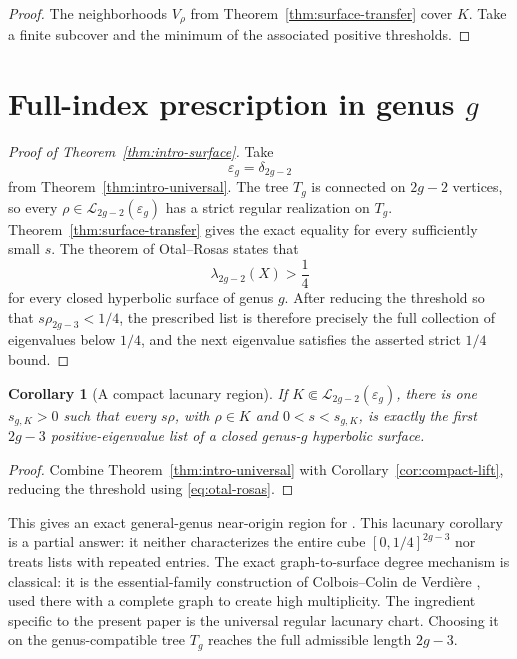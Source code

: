 \documentclass[11pt,reqno]{amsart}
\newtheorem{corollary}[theorem]{Corollary}
\theoremstyle{definition}
\theoremstyle{remark}
\newcommand{\cL}{\mathcal L}
\begin{document}
\begin{proof}
The neighborhoods $V_\rho$ from Theorem~\ref{thm:surface-transfer} cover
$K$.  Take a finite subcover and the minimum of the associated positive
thresholds.
\end{proof}

\section{Full-index prescription in genus \texorpdfstring{$g$}{g}}
\label{sec:full-index}

\begin{proof}[Proof of Theorem~\ref{thm:intro-surface}]
Take
\[
 \varepsilon_g=\delta_{2g-2}
\]
from Theorem~\ref{thm:intro-universal}.  The tree $T_g$ is connected on
$2g-2$ vertices, so every $\rho\in\cL_{2g-2}(\varepsilon_g)$ has a strict
regular realization on $T_g$.  Theorem~\ref{thm:surface-transfer} gives the
exact equality for every sufficiently small $s$.  The theorem of
Otal--Rosas \cite{OtalRosas2009} states that
\begin{equation}\label{eq:otal-rosas}
 \lambda_{2g-2}(X)>\frac14
\end{equation}
for every closed hyperbolic surface of genus $g$.  After reducing the
threshold so that $s\rho_{2g-3}<1/4$, the prescribed list is therefore
precisely the full collection of eigenvalues below $1/4$, and the next
eigenvalue satisfies the asserted strict $1/4$ bound.
\end{proof}

\begin{corollary}[A compact lacunary region]\label{cor:lacunary-compact}
If $K\Subset\cL_{2g-2}(\varepsilon_g)$, there is one $s_{g,K}>0$ such that
every $s\rho$, with $\rho\in K$ and $0<s<s_{g,K}$, is exactly the first
$2g-3$ positive-eigenvalue list of a closed genus-$g$ hyperbolic surface.
\end{corollary}

\begin{proof}
Combine Theorem~\ref{thm:intro-universal} with
Corollary~\ref{cor:compact-lift}, reducing the threshold using
\eqref{eq:otal-rosas}.
\end{proof}

This gives an exact general-genus near-origin region for
\cite[Question~1]{EJT2026}.  This lacunary corollary is a partial answer: it
neither characterizes the entire cube $[0,1/4]^{2g-3}$ nor treats lists with
repeated entries.  The
exact graph-to-surface degree mechanism is classical: it is the
essential-family construction of Colbois--Colin de Verdi\`ere
\cite[Lemma~V.1 and Section~VI]{ColboisCdV1988}, used there with a complete
graph to create high multiplicity.  The ingredient specific to the present
paper is the universal regular lacunary chart.  Choosing it on the
genus-compatible tree $T_g$ reaches the full admissible length $2g-3$.
\end{document}
